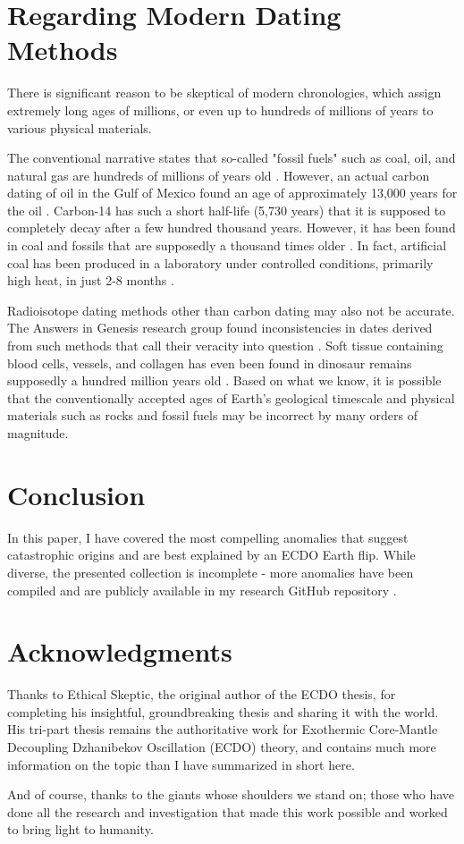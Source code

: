 \documentclass[10pt,twocolumn,letterpaper]{article}
\begin{document}
\section{Regarding Modern Dating Methods}

There is significant reason to be skeptical of modern chronologies, which assign extremely long ages of millions, or even up to hundreds of millions of years to various physical materials.

The conventional narrative states that so-called "fossil fuels" such as coal, oil, and natural gas are hundreds of millions of years old \cite{104}. However, an actual carbon dating of oil in the Gulf of Mexico found an age of approximately 13,000 years for the oil \cite{105}. Carbon-14 has such a short half-life (5,730 years) that it is supposed to completely decay after a few hundred thousand years. However, it has been found in coal and fossils that are supposedly a thousand times older \cite{106}. In fact, artificial coal has been produced in a laboratory under controlled conditions, primarily high heat, in just 2-8 months \cite{107}.

Radioisotope dating methods other than carbon dating may also not be accurate. The Answers in Genesis research group found inconsistencies in dates derived from such methods that call their veracity into question \cite{108}. Soft tissue containing blood cells, vessels, and collagen has even been found in dinosaur remains supposedly a hundred million years old \cite{109,110}. Based on what we know, it is possible that the conventionally accepted ages of Earth's geological timescale and physical materials such as rocks and fossil fuels may be incorrect by many orders of magnitude.

\section{Conclusion}

In this paper, I have covered the most compelling anomalies that suggest catastrophic origins and are best explained by an ECDO Earth flip. While diverse, the presented collection is incomplete - more anomalies have been compiled and are publicly available in my research GitHub repository \cite{2}.

\section{Acknowledgments}

Thanks to Ethical Skeptic, the original author of the ECDO thesis, for completing his insightful, groundbreaking thesis and sharing it with the world. His tri-part thesis \cite{1} remains the authoritative work for Exothermic Core-Mantle Decoupling Dzhanibekov Oscillation (ECDO) theory, and contains much more information on the topic than I have summarized in short here.

And of course, thanks to the giants whose shoulders we stand on; those who have done all the research and investigation that made this work possible and worked to bring light to humanity.

\clearpage
\twocolumn

{\small
\renewcommand{\refname}{References}


}
\end{document}
